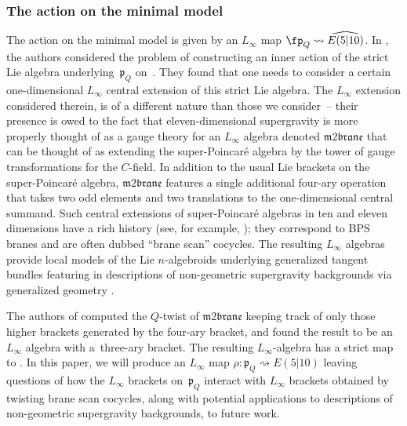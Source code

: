 \documentclass[10pt,a4paper]{amsart}
\numberwithin{equation}{section}
\theoremstyle{definition}
\begin{document}
\subsubsection{The action on the minimal model}
The action on the minimal model is given by an $L_\infty$ map $\fp_Q \rightsquigarrow \smash{\widehat{E(5|10)}}$. In \cite{RSW}, the authors considered the problem of constructing an inner action of the strict Lie algebra underlying~$\mathfrak{p}_Q$ on~. They found that one needs to consider a certain one-dimensional $L_\infty$ central extension of this strict Lie algebra. The $L_\infty$ extension considered therein, is of a different nature than those we consider~-- their presence is owed to the fact that eleven-dimensional supergravity is more properly thought of as a gauge theory for an $L_\infty$ algebra denoted $\mathfrak{m2brane}$ that can be thought of as extending the super-Poincar\'e algebra by the tower of gauge transformations for the $C$-field. In addition to the usual Lie brackets on the super-Poincar\'e algebra, $\mathfrak{m2brane}$ features a single additional four-ary operation that takes two odd elements and two translations to the one-dimensional central summand. Such central extensions of super-Poincar\'e algebras in ten and eleven dimensions have a rich history (see, for example, \cite{FSS}); they correspond to BPS branes and are often dubbed ``brane scan'' cocycles. The resulting $L_\infty$ algebras provide local models of the Lie $n$-algebroids underlying generalized tangent bundles featuring in descriptions of non-geometric supergravity backgrounds via generalized geometry \cite{Cederwall_2019, malgebra,Hull_2007, smithwaldram}.

The authors of \cite{RSW} computed the $Q$-twist of $\mathfrak{m2brane}$ keeping track of only those higher brackets generated by the four-ary bracket, and found the result to be an $L_\infty$ algebra with a~three-ary bracket. The resulting $L_\infty$-algebra has a strict map to . In this paper, we will produce an $L_\infty$ map
$\rho\colon\mathfrak{p}_Q \rightsquigarrow E(5|10)$
leaving questions of how the $L_\infty$ brackets on~$\mathfrak{p}_Q$ interact with $L_\infty$ brackets obtained by twisting brane scan cocycles, along with potential applications to descriptions of non-geometric supergravity backgrounds, to future work.
\end{document}
